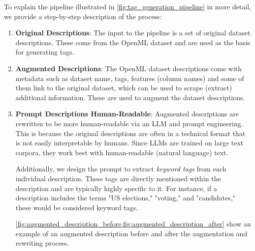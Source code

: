 To explain the pipeline illustrated in \cref{fig:tag_generation_pipeline} in more detail, we provide a step-by-step description of the process:

\begin{enumerate}
    \item \textbf{Original Descriptions}: The input to the pipeline is a set of original dataset descriptions. These come from the OpenML dataset and are used as the basis for generating tags.
    \item \textbf{Augmented Descriptions}: The OpenML dataset descriptions come with metadata such as dataset name, tags, features (column names) and some of them link to the original dataset, which can be used to scrape (extract) additional information. These are used to augment the dataset descriptions.
    \item \textbf{Prompt Descriptions Human-Readable}: Augmented descriptions are rewritten to be more human-readable via an LLM and prompt engineering. This is because the original descriptions are often in a technical format that is not easily interpretable by humans. Since LLMs are trained on large text corpora, they work best with human-readable (natural language) text.
    
    Additionally, we design the prompt to extract \textit{keyword tags} from each individual description. These tags are directly mentioned within the description and are typically highly specific to it. For instance, if a description includes the terms "US elections," "voting," and "candidates," these would be considered keyword tags.

    \cref{fig:augmented_description_before,fig:augmented_description_after} show an example of an augmented description before and after the augmentation and rewriting process.


\end{enumerate}
